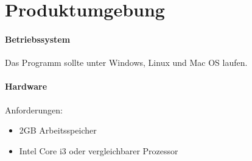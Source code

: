\section{Produktumgebung}

\paragraph{Betriebssystem}
  Das Programm sollte unter Windows, Linux und Mac OS laufen.
  
\paragraph{Hardware}
  Anforderungen: 
  \begin{itemize}
    \item 2GB Arbeitsspeicher
    \item Intel Core i3 oder vergleichbarer Prozessor
  \end{itemize}
  
